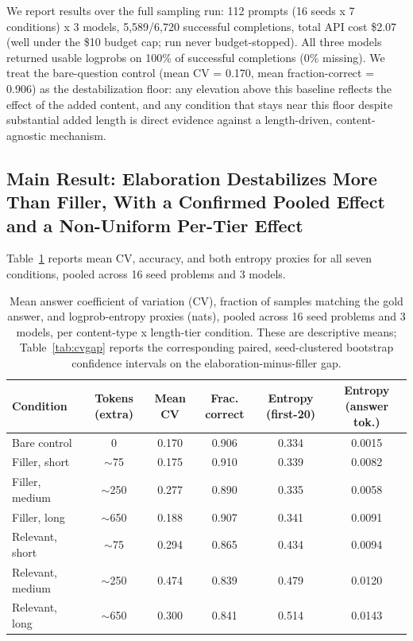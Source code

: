 \documentclass[11pt,letterpaper]{article}
\begin{document}
We report results over the full sampling run: 112 prompts (16 seeds x 7 conditions) x 3 models, 5,589/6,720 successful completions, total API cost \$2.07 (well under the \$10 budget cap; run never budget-stopped). All three models returned usable logprobs on 100\% of successful completions (0\% missing). We treat the bare-question control (mean CV = 0.170, mean fraction-correct = 0.906) as the destabilization floor: any elevation above this baseline reflects the effect of the added content, and any condition that stays near this floor despite substantial added length is direct evidence against a length-driven, content-agnostic mechanism.

\subsection{Main Result: Elaboration Destabilizes More Than Filler, With a Confirmed Pooled Effect and a Non-Uniform Per-Tier Effect}
\label{sec:main-result}

Table~\ref{tab:main} reports mean CV, accuracy, and both entropy proxies for all seven conditions, pooled across 16 seed problems and 3 models.

\begin{table}[!htbp]
\centering
\small
\begin{tabular}{lccccc}
\toprule
Condition & Tokens (extra) & Mean CV & Frac. correct & Entropy (first-20) & Entropy (answer tok.) \\
\midrule
Bare control & 0 & 0.170 & 0.906 & 0.334 & 0.0015 \\
Filler, short & $\sim$75 & 0.175 & 0.910 & 0.339 & 0.0082 \\
Filler, medium & $\sim$250 & 0.277 & 0.890 & 0.335 & 0.0058 \\
Filler, long & $\sim$650 & 0.188 & 0.907 & 0.341 & 0.0091 \\
Relevant, short & $\sim$75 & 0.294 & 0.865 & 0.434 & 0.0094 \\
Relevant, medium & $\sim$250 & 0.474 & 0.839 & 0.479 & 0.0120 \\
Relevant, long & $\sim$650 & 0.300 & 0.841 & 0.514 & 0.0143 \\
\bottomrule
\end{tabular}
\caption{Mean answer coefficient of variation (CV), fraction of samples matching the gold answer, and logprob-entropy proxies (nats), pooled across 16 seed problems and 3 models, per content-type x length-tier condition. These are descriptive means; Table~\ref{tab:cvgap} reports the corresponding paired, seed-clustered bootstrap confidence intervals on the elaboration-minus-filler gap.}
\label{tab:main}
\end{table}
\end{document}
